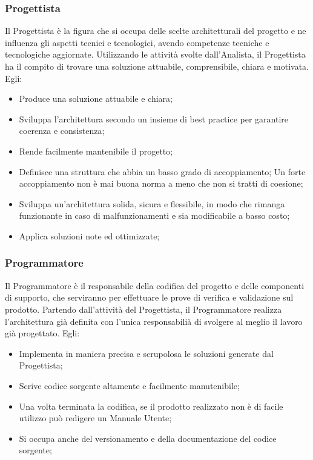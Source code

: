 \subsubsection{Progettista}
Il Progettista è la figura che si occupa delle scelte architetturali del progetto e ne influenza gli aspetti tecnici e tecnologici, avendo competenze tecniche e tecnologiche aggiornate.
Utilizzando le attività svolte dall'Analista, il Progettista ha il compito di trovare una soluzione attuabile, comprensibile, chiara e motivata.
Egli:
\begin{itemize}
\item{Produce una soluzione attuabile e chiara;}
\item{Sviluppa l’architettura secondo un insieme di best practice per garantire coerenza e consistenza;}
\item{Rende facilmente mantenibile il progetto;}
\item{Definisce una struttura che abbia un basso grado di accoppiamento; Un forte accoppiamento non è mai buona norma a meno che non si tratti di coesione;}
\item{Sviluppa un’architettura solida,  sicura  e  flessibile, in modo  che rimanga funzionante in caso di malfunzionamenti e sia modificabile a basso costo;}
\item{Applica soluzioni note ed ottimizzate;}
\end{itemize}

\subsubsection{Programmatore}
Il Programmatore è il responsabile della codifica del progetto e delle componenti di supporto, che serviranno per effettuare le prove di verifica e validazione sul prodotto.
Partendo dall’attività del Progettista, il Programmatore realizza l’architettura già definita con l’unica responsabilià di svolgere al meglio il lavoro già progettato.
Egli:
\begin{itemize}
\item{Implementa in maniera precisa e scrupolosa le soluzioni generate dal Progettista;}
\item{Scrive codice sorgente altamente e facilmente manutenibile;}
\item{Una volta terminata la codifica, se il prodotto realizzato non è di facile utilizzo può redigere un Manuale Utente;}
\item{Si occupa anche del versionamento e della documentazione del codice sorgente;}
\end{itemize}

